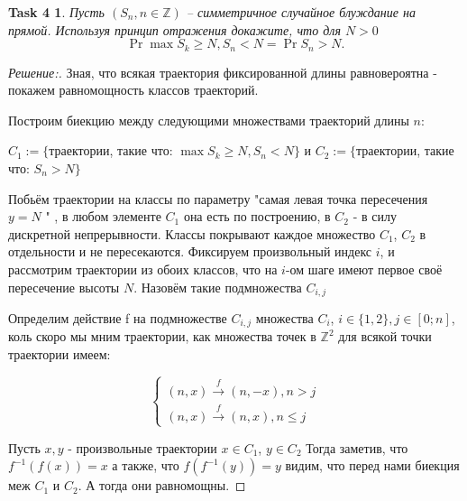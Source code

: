 \documentclass{article}
\newtheorem*{task4}{Task 4}
\newcommand{\Z}{\mathbb{Z}}
\begin{document}
        
    \vspace{\baselineskip}
    \begin{task4}
            Пусть $(S_n, n\in \Z)$ -- симметричное случайное блуждание на прямой. Используя принцип отражения докажите, что для $N > 0$
            \[
            \Pr{ \max S_k \geq N, S_n < N} = \Pr{S_n > N}.
            \]
        \end{task4} 
    \begin{proof} [Решение:]
    Зная, что всякая траектория фиксированной длины равновероятна - покажем равномощность классов траекторий.
    
    \vspace{\baselineskip}
    
    Построим биекцию между следующими множествами траекторий длины $n$:
    
    $C_1 := \{$траектории, такие что: $\max S_k \geq N, S_n < N\}$ и $C_2 := \{$траектории, такие что: $S_n > N\}$ 
    

    \vspace{\baselineskip}
    
    Побьём траектории на классы по параметру "самая левая точка пересечения $y = N$ " , в любом элементе $C_1$ она есть по построению, в $C_2$ - в силу дискретной непрерывности. Классы покрывают каждое множество $C_1$, $ C_2$ в отдельности и не пересекаются. Фиксируем произвольный индекс $i$, и рассмотрим траектории из обоих классов, что на $i$-ом шаге имеют первое своё пересечение высоты $N$. Назовём такие подмножества $C_{i, j}$ 
    
    Определим действие f на подмножестве $C_{i, j}$ множества $C_i$, $i \in \{1, 2\}, j \in [0 ; n]$, коль скоро мы мним траектории, как множества точек в $\mathbb{Z}^2$ для всякой точки траектории имеем:
    
    \begin{equation*}
       \begin{cases}
       (n, x) \xrightarrow{f} (n, -x), n > j\\
       (n, x) \xrightarrow{f} (n, x), n \leq j
       \end{cases}
       \end{equation*}
       
       
    Пусть $x, y$ - произвольные траектории $x \in C_1$, $y \in C_2$ 
    Тогда заметив, что $f^{-1}(f(x)) = x$ а также, что $f(f^{-1}(y)) = y$ видим, что перед нами биекция меж $C_1$ и $C_2$. А тогда они равномощны.
    
    \end{proof}
    
\end{document}
